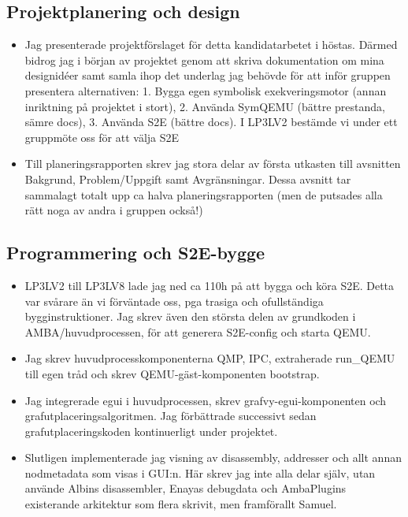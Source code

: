 \subsection*{Projektplanering och design}

\begin{itemize}

	\item Jag presenterade projektförslaget för detta kandidatarbetet i höstas. Därmed bidrog jag i
	      början av projektet genom att skriva dokumentation om mina designidéer samt samla ihop det
	      underlag jag behövde för att inför gruppen presentera alternativen: 1. Bygga egen symbolisk
	      exekveringsmotor (annan inriktning på projektet i stort), 2. Använda SymQEMU (bättre prestanda,
	      sämre docs), 3. Använda S2E (bättre docs). I LP3LV2 bestämde vi under ett gruppmöte oss för att
	      välja S2E

	\item Till planeringsrapporten skrev jag stora delar av första utkasten till avsnitten Bakgrund,
	      Problem/Uppgift samt Avgränsningar. Dessa avsnitt tar sammalagt totalt upp ca halva
	      planeringsrapporten (men de putsades alla rätt noga av andra i gruppen också!)

\end{itemize}

\subsection*{Programmering och S2E-bygge}

\begin{itemize}

	\item LP3LV2 till LP3LV8 lade jag ned ca 110h på att bygga och köra S2E. Detta var svårare än vi
	      förväntade oss, pga trasiga och ofullständiga bygginstruktioner. Jag skrev även den största
	      delen av grundkoden i AMBA/huvudprocessen, för att generera S2E-config och starta QEMU.

	\item Jag skrev huvudprocesskomponenterna QMP, IPC, extraherade run\_QEMU till egen tråd och
	      skrev QEMU-gäst-komponenten bootstrap.

	\item Jag integrerade egui i huvudprocessen, skrev grafvy-egui-komponenten och
	      grafutplaceringsalgoritmen. Jag förbättrade successivt sedan grafutplaceringskoden kontinuerligt
	      under projektet.

	\item Slutligen implementerade jag visning av disassembly, addresser och allt annan nodmetadata
	      som visas i GUI:n. Här skrev jag inte alla delar själv, utan använde Albins disassembler, Enayas
	      debugdata och AmbaPlugins existerande arkitektur som flera skrivit, men framförallt Samuel.

\end{itemize}

